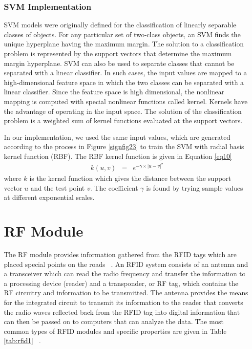 \documentclass[a4paper,oneside,12pt]{report}
\begin{document}
\subsubsection{SVM Implementation}
SVM \cite{cortes_support-vector_1995} models were originally defined for the classification of linearly separable classes of objects. For any particular set of two-class objects, an SVM finds the unique hyperplane having the maximum margin. The solution to a classification problem is represented by the support vectors that determine the maximum margin hyperplane. SVM can also be used to separate classes that cannot be separated with a linear classifier. In such cases, the input values are mapped to a high-dimensional feature space in which the two classes can be separated with a linear classifier. Since the feature space is high dimensional, the nonlinear mapping is computed with special nonlinear functions called kernel. Kernels have the advantage of operating in the input space. The solution of the classification problem is a weighted sum of kernel functions evaluated at the support vectors. 
\par
In our implementation, we used the same input values, which are generated according to the process in Figure \ref{signfig23} to train the SVM with radial basis kernel function (RBF). The RBF kernel function is given in Equation \ref{eq10}
\begin{eqnarray}
\label{eq10}
	k(u,v) &=& e^{-\gamma \times |u-v|^2}
\end{eqnarray}
\noindent where $k$ is the kernel function which gives the distance between the support vector $u$ and the test point $v$. The coefficient $\gamma$ is found by trying sample values at different exponential scales.
\par

\section{RF Module}
The RF module provides information gathered from the RFID tags which are placed special points on the roads ~\cite{sato_development_2006}. An RFID system consists of an antenna and a transceiver which can read the radio frequency and transfer the information to a processing device (reader) and a  transponder, or RF tag, which contains the RF circuitry and information to be transmitted.  The antenna provides the means for the integrated circuit to transmit its information to the reader that converts the radio waves reflected back from the RFID tag into digital information that can then be passed on to computers that can analyze the data. The most common types of RFID modules and specific properties are given in Table \ref{tab:rfid1} ~\cite{finkenzeller_fundamentals_2010}.
\end{document}
